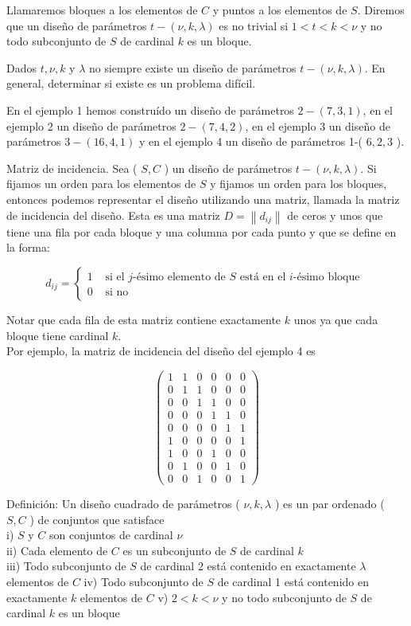 \documentclass[10pt]{article}
\begin{document}
Llamaremos bloques a los elementos de $C$ y puntos a los elementos de $S$. Diremos que un diseño de parámetros $t-(\nu, k, \lambda)$ es no trivial si $1<t<k<\nu$ y no todo subconjunto de $S$ de cardinal $k$ es un bloque.

Dados $t, \nu, k$ y $\lambda$ no siempre existe un diseño de parámetros $t-(\nu, k, \lambda)$. En general, determinar si existe es un problema difícil.

En el ejemplo 1 hemos construído un diseño de parámetros $2-(7,3,1)$, en el ejemplo 2 un diseño de parámetros $2-(7,4,2)$, en el ejemplo 3 un diseño de parámetros $3-(16,4,1)$ y en el ejemplo 4 un diseño de parámetros 1-( $6,2,3$ ).

Matriz de incidencia. Sea ( $S, C$ ) un diseño de parámetros $t-(\nu, k, \lambda)$. Si fijamos un orden para los elementos de $S$ y fijamos un orden para los bloques, entonces podemos representar el diseño utilizando una matriz, llamada la matriz de incidencia del diseño. Esta es una matriz $D=\left\|d_{i j}\right\|$ de ceros y unos que tiene una fila por cada bloque y una columna por cada punto y que se define en la forma:

$$
d_{i j}= \begin{cases}1 & \text { si el } j \text {-ésimo elemento de } S \text { está en el } i \text {-ésimo bloque } \\ 0 & \text { si no }\end{cases}
$$

Notar que cada fila de esta matriz contiene exactamente $k$ unos ya que cada bloque tiene cardinal $k$.\\
Por ejemplo, la matriz de incidencia del diseño del ejemplo 4 es

$$
\left(\begin{array}{llllll}
1 & 1 & 0 & 0 & 0 & 0 \\
0 & 1 & 1 & 0 & 0 & 0 \\
0 & 0 & 1 & 1 & 0 & 0 \\
0 & 0 & 0 & 1 & 1 & 0 \\
0 & 0 & 0 & 0 & 1 & 1 \\
1 & 0 & 0 & 0 & 0 & 1 \\
1 & 0 & 0 & 1 & 0 & 0 \\
0 & 1 & 0 & 0 & 1 & 0 \\
0 & 0 & 1 & 0 & 0 & 1
\end{array}\right)
$$

Definición: Un diseño cuadrado de parámetros ( $\nu, k, \lambda$ ) es un par ordenado ( $S, C$ ) de conjuntos que satisface\\
i) $S$ y $C$ son conjuntos de cardinal $\nu$\\
ii) Cada elemento de $C$ es un subconjunto de $S$ de cardinal $k$\\
iii) Todo subconjunto de $S$ de cardinal 2 está contenido en exactamente $\lambda$ elementos de $C$ iv) Todo subconjunto de $S$ de cardinal 1 está contenido en exactamente $k$ elementos de $C$ v) $2<k<\nu$ y no todo subconjunto de $S$ de cardinal $k$ es un bloque
\end{document}
